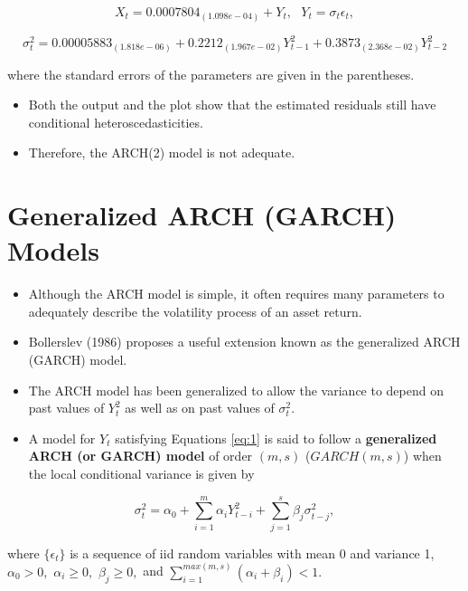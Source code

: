 \documentclass[]{book}
\providecommand{\tightlist}{%
  \setlength{\itemsep}{0pt}\setlength{\parskip}{0pt}}
\begin{document}
\[X_t = 0.0007804_{(1.098e-04)} + Y_t, \text{  }Y_t=\sigma_t\epsilon_t,\]

\[\sigma_t^2=0.00005883_{(1.818e-06)}+0.2212_{(1.967e-02)}Y_{t-1}^2 + 0.3873_{(2.368e-02)}Y_{t-2}^2\]

where the standard errors of the parameters are given in the parentheses.

\begin{itemize}
\tightlist
\item
  Both the output and the plot show that the estimated residuals still have conditional heteroscedasticities.
\item
  Therefore, the ARCH(2) model is not adequate.
\end{itemize}

\hypertarget{generalized-arch-garch-models}{%
\section{Generalized ARCH (GARCH) Models}\label{generalized-arch-garch-models}}

\begin{itemize}
\item
  Although the ARCH model is simple, it often requires many parameters to adequately describe the volatility process of an asset return.
\item
  Bollerslev (1986) proposes a useful extension known as the generalized ARCH (GARCH) model.
\item
  The ARCH model has been generalized to allow the variance to depend on past values of \(Y_t^2\) as well as on past values of \(\sigma^2_t.\)
\item
  A model for \(Y_t\) satisfying Equations \ref{eq:1} is said to follow a \textbf{generalized ARCH (or GARCH) model} of order \((m,s)\) (\(GARCH(m,s)\)) when the local conditional variance is given by
\end{itemize}

\begin{equation} \label{eq:3}
\sigma_t^2 =\alpha_0+\sum_{i=1}^m\alpha_iY_{t-i}^2+\sum_{j=1}^s\beta_j\sigma_{t-j}^2,
\end{equation}

where \(\{\epsilon_t\}\) is a sequence of iid random variables with mean 0 and variance 1, \(\alpha_0>0,\) \(\alpha_i\geq0,\) \(\beta_j\geq0,\) and
\(\sum_{i=1}^{max(m,s)}(\alpha_i+\beta_i)<1.\)
\end{document}
